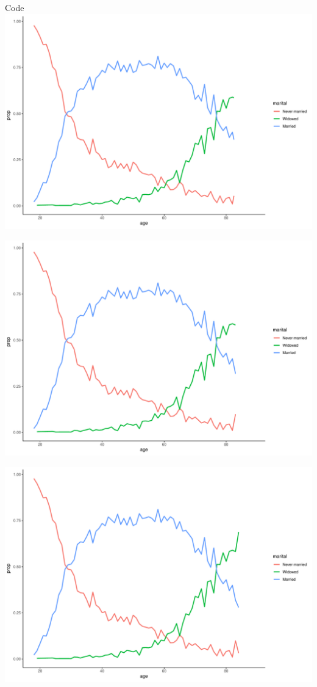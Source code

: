 \documentclass[
  ignorenonframetext,
]{beamer}
\begin{document}
\begin{frame}[fragile]{Code}
\includegraphics{gss_cat_files/figure-beamer/unnamed-chunk-1-95.pdf}

\includegraphics{gss_cat_files/figure-beamer/unnamed-chunk-1-96.pdf}

\includegraphics{gss_cat_files/figure-beamer/unnamed-chunk-1-97.pdf}


\end{frame}
\end{document}
